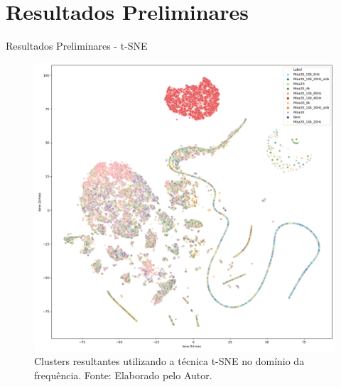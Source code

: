\documentclass[aspectratio=169]{beamer}
\begin{document}
\section{Resultados Preliminares}
\begin{frame}{Resultados Preliminares - t-SNE}
	\begin{figure}[HT]
		\begin{center}
			\includegraphics[scale=.19]{../resultados/img/fft-t-sne-1.png}
			\caption{Clusters resultantes utilizando a técnica t-SNE no domínio da frequência. \newline
			Fonte: Elaborado pelo Autor.}
			\label{fig:fft-t-sne-1}
		\end{center}
	\end{figure}
\end{frame}

\end{document}
